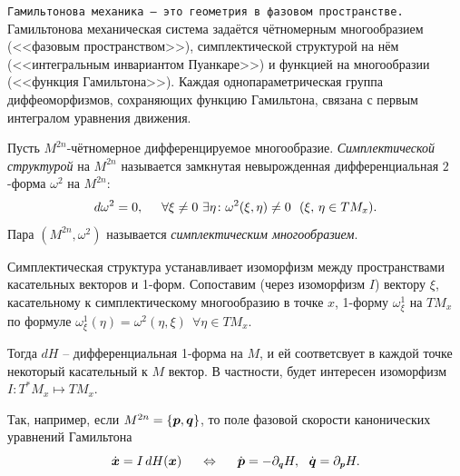 \texttt{Гамильтонова механика -- это геометрия в фазовом пространстве.} Гамильтонова механическая система задаётся чётномерным многообразием (<<фазовым пространством>>), симплектической структурой на нём (<<интегральным инвариантом Пуанкаре>>) и функцией на многообразии (<<функция Гамильтона>>). Каждая однопараметрическая группа диффеоморфизмов, сохраняющих функцию Гамильтона, связана с первым интегралом уравнения движения. 




\begin{to_def}
    Пусть $M^{2n}$-чётномерное дифференцируемое многообразие. \textit{Симплектической структурой} на $M^{2n}$ называется замкнутая невырожденная дифференциальная $2$-форма $\omega^2$ на $M^{2n}$:
    \begin{equation*}
        d \omega^2 = 0, \hspace{5 mm} 
        \forall \xi \neq 0 \ \exists \eta \colon  \omega^2 (\xi, \eta) \neq 0 \ \ (\xi,\, \eta \in TM_x).
    \end{equation*}
    Пара $(M^{2n}, \omega^2)$ называется \textit{симплектическим многообразием}.
\end{to_def}




\begin{to_def}
    Симплектическая структура устанавливает изоморфизм между пространствами касательных векторов и 1-форм. Сопоставим (через изоморфизм $I$) вектору $\xi$, касательному к симплектическому многообразию в точке $x$, 1-форму $\omega_\xi^1$ на $TM_x$ по формуле $\omega^1_\xi (\eta) = \omega^2 (\eta, \xi) \ \ \forall \eta \in TM_x$. 
\end{to_def}

Тогда $d H$ -- дифференциальная 1-форма на $M$, и ей соответсвует в каждой точке некоторый касательный к $M$ вектор. В частности, будет интересен изоморфизм $I \colon  T^* M_x \mapsto TM_x$.

Так, например, если $M^{2n} = \left\{\mbox{\boldmath $p$}, \mbox{\boldmath $q$}\right\}$, то поле фазовой скорости канонических уравнений Гамильтона
\begin{equation*}
    \dot{\vc{x}} =  I \d H (\vc{x}) 
    \hspace{5 mm}  \Leftrightarrow \hspace{5 mm} 
    \dot{\vc{p}} = - \partial_{\smallvc{q}} H,  \ \  \dot{\vc{q}} = \partial_{\smallvc{p}} H.
\end{equation*}

